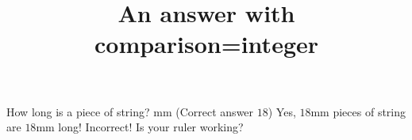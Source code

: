 \documentclass[hidesidemenu]{webquiztex}
\title{An answer with comparison=integer}
\begin{document}
  \begin{question}     %
     How long is a piece of string?
      mm (Correct answer $18$)
     \whenRight Yes, $18$mm pieces of string are $18$mm long!
     \whenWrong Incorrect! Is your ruler working?
  \end{question}
\end{document}
